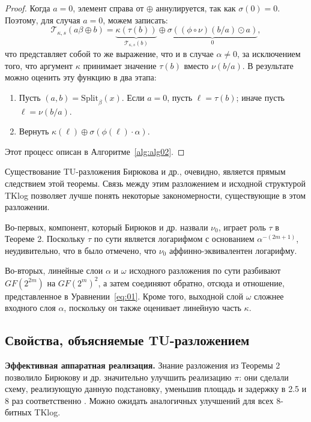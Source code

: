 \begin{proof}
Когда \(a = 0\), элемент справа от \(\oplus\) аннулируется, так как \(\sigma(0) = 0\). Поэтому, для случая \(a = 0\), можем записать:
\[
  \mathscr{T}_{\kappa, s}(a \beta \oplus b)=\underbrace{\kappa(\tau(b))}_{\mathscr{T}_{\kappa, s}(b)} \oplus \underbrace{\sigma((\phi \circ \nu)(b / a) \odot a)}_0,
\]
что представляет собой то же выражение, что и в случае \(\alpha \neq 0\), за исключением того, что аргумент \(\kappa\) принимает значение \(\tau(b)\) вместо \(\nu(b/a)\). В результате можно оценить эту функцию в два этапа:

\begin{enumerate}
  \item Пусть \((a, b) = \mathrm{Split}_{\beta}(x)\). Если \(a = 0\), пусть \(\ell = \tau(b)\); иначе пусть \(\ell = \nu(b/a)\).
  \item Вернуть \(\kappa(\ell) \oplus \sigma(\phi(\ell) \cdot \alpha)\).
\end{enumerate}

Этот процесс описан в Алгоритме~\ref{alg:alg02}.
\end{proof}

Существование TU-разложения Бирюкова и др., очевидно, является прямым следствием этой теоремы. Связь между этим разложением и исходной структурой TKlog позволяет лучше понять некоторые закономерности, существующие в этом разложении.

Во-первых, компонент, который Бирюков и др. назвали \(\nu_0\), играет роль \(\tau\) в Теореме 2. Поскольку \(\tau\) по сути является логарифмом с основанием \(\alpha^{-(2m+1)}\), неудивительно, что в \cite{PU16} было отмечено, что \(\nu_0\) аффинно-эквивалентен логарифму.

Во-вторых, линейные слои \(\alpha\) и \(\omega\) исходного разложения по сути разбивают \(GF(2^{2m})\) на \(GF(2^m)^2\), а затем соединяют обратно, отсюда и отношение, представленное в Уравнении~\ref{eq:01}. Кроме того, выходной слой \(\omega\) сложнее входного слоя \(\alpha\), поскольку он также оценивает линейную часть \(\kappa\).

\subsection{Свойства, объясняемые TU-разложением}

\textbf{Эффективная аппаратная реализация.} Знание разложения из Теоремы 2 позволило Бирюкову и др. значительно улучшить реализацию \(\pi\): они сделали схему, реализующую данную подстановку, уменьшив площадь и задержку в 2.5 и 8 раз соответственно \cite{BPU16b}. Можно ожидать аналогичных улучшений для всех 8-битных TKlog.

